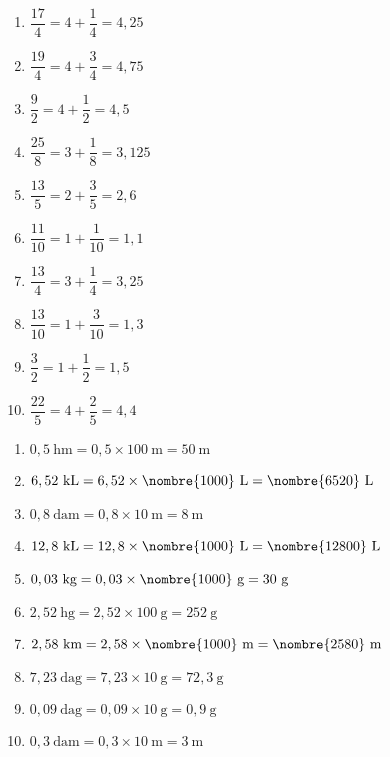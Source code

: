 \documentclass[a4paper,11pt,fleqn]{article}
\begin{document}
\begin{correction}
\exo{}

\begin{multicols}{2}
\begin{enumerate}[itemsep=2em]
	\item $ \dfrac{17}{4} = 4+\dfrac{1}{4} = 4,25 $
	\item $ \dfrac{19}{4} = 4+\dfrac{3}{4} = 4,75 $
	\item $ \dfrac{9}{2} = 4+\dfrac{1}{2} = 4,5 $
	\item $ \dfrac{25}{8} = 3+\dfrac{1}{8} = 3,125 $
	\item $ \dfrac{13}{5} = 2+\dfrac{3}{5} = 2,6 $
	\item $ \dfrac{11}{10} = 1+\dfrac{1}{10} = 1,1 $
	\item $ \dfrac{13}{4} = 3+\dfrac{1}{4} = 3,25 $
	\item $ \dfrac{13}{10} = 1+\dfrac{3}{10} = 1,3 $
	\item $ \dfrac{3}{2} = 1+\dfrac{1}{2} = 1,5 $
	\item $ \dfrac{22}{5} = 4+\dfrac{2}{5} = 4,4 $
\end{enumerate}
\end{multicols}

\exo{}

\begin{multicols}{2}
\begin{enumerate}
	\item $ 0,5~\text{hm} =  0,5\times100~\text{m} = 50~\text{m}$
	\item $ 6,52~\text{kL} =  6,52\times\nombre{1000}~\text{L} = \nombre{6520}~\text{L}$
	\item $ 0,8~\text{dam} =  0,8\times10~\text{m} = 8~\text{m}$
	\item $ 12,8~\text{kL} =  12,8\times\nombre{1000}~\text{L} = \nombre{12800}~\text{L}$
	\item $ 0,03~\text{kg} =  0,03\times\nombre{1000}~\text{g} = 30~\text{g}$
	\item $ 2,52~\text{hg} =  2,52\times100~\text{g} = 252~\text{g}$
	\item $ 2,58~\text{km} =  2,58\times\nombre{1000}~\text{m} = \nombre{2580}~\text{m}$
	\item $ 7,23~\text{dag} =  7,23\times10~\text{g} = 72,3~\text{g}$
	\item $ 0,09~\text{dag} =  0,09\times10~\text{g} = 0,9~\text{g}$
	\item $ 0,3~\text{dam} =  0,3\times10~\text{m} = 3~\text{m}$
\end{enumerate}
\end{multicols}


\end{correction}
\end{document}

